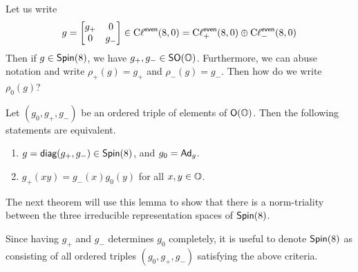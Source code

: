 \begin{remark*}
    Let us write
    \[g =\begin{bmatrix}g_+&0\\0&g_-\end{bmatrix}\in\operatorname{C\ell}^{\textsf{even}}(8,0) = \operatorname{C\ell}_+^{\textsf{even}}(8,0)\oplus \operatorname{C\ell}_-^{\textsf{even}}(8,0)\]
    Then if $g\in \operatorname{\textsf{Spin}}(8)$, we have $g_+,g_-\in\operatorname{\textsf{SO}}(\operatorname{\mathbb{O}})$. Furthermore, we can abuse notation and write $\rho_+(g)=g_+$ and $\rho_-(g)=g_-$. Then how do we write $\rho_0(g)$?
\end{remark*}
\begin{lemma}
Let $(g_0, g_+, g_-)$ be an ordered triple of elements of $\operatorname{\textsf{O}}(\operatorname{\mathbb{O}})$. Then the following statements are equivalent.
\begin{enumerate}
    \item $g=
\operatorname{\textsf{diag}}(g_+, g_-)\in \operatorname{\textsf{Spin}}(8)$, and $g_0 = \operatorname{\textsf{Ad}}_g$.
\item $g_+(xy) = g_-(x)g_0(y)$ for all $x,y \in \operatorname{\mathbb{O}}$.
\end{enumerate}
The next theorem will use this lemma to show that there is a norm-triality between the three irreducible representation spaces of $\operatorname{\textsf{Spin}}(8)$.
\end{lemma}
\begin{remark*}
    Since having $g_+$ and $g_-$ determines $g_0$ completely, it is useful to denote $\operatorname{\textsf{Spin}}(8)$ as consisting of all ordered triples $(g_0,g_+,g_-)$ satisfying the above criteria. 
\end{remark*}


